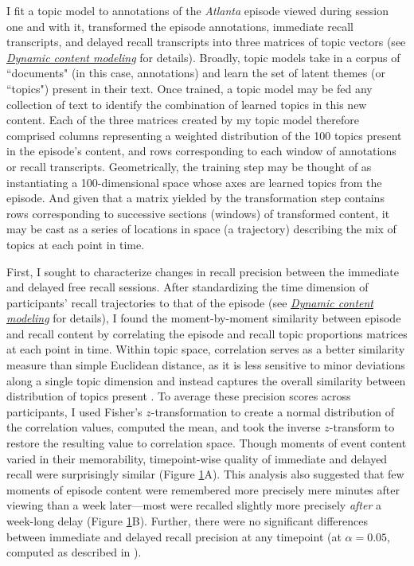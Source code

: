 \documentclass{article}
\begin{document}
\begin{figure}[p]
\label{fig:immdel}
\end{figure}

I fit a topic model to annotations of the \textit{Atlanta} episode viewed during session one and with it, transformed the episode annotations, immediate recall transcripts, and delayed recall transcripts into three matrices of topic vectors (see \hyperref[sec:topicmodeling]{\textit{Dynamic content modeling}} for details).  Broadly, topic models take in a corpus of ``documents" (in this case, annotations) and learn the set of latent themes (or ``topics") present in their text.  Once trained, a topic model may be fed any collection of text to identify the combination of learned topics in this new content.  Each of the three matrices created by my topic model therefore comprised columns representing a weighted distribution of the 100 topics present in the episode's content, and rows corresponding to each window of annotations or recall transcripts.  Geometrically, the training step may be thought of as instantiating a 100-dimensional space whose axes are learned topics from the episode.  And given that a matrix yielded by the transformation step contains rows corresponding to successive sections (windows) of transformed content, it may be cast as a series of locations in space (a trajectory) describing the mix of topics at each point in time.

First, I sought to characterize changes in recall precision between the immediate and delayed free recall sessions.  After standardizing the time dimension of participants' recall trajectories to that of the episode (see \hyperref[sec:topicmodeling]{\textit{Dynamic content modeling}} for details), I found the moment-by-moment similarity between episode and recall content by correlating the episode and recall topic proportions matrices at each point in time.  Within topic space, correlation serves as a better similarity measure than simple Euclidean distance, as it is less sensitive to minor deviations along a single topic dimension and instead captures the overall similarity between distribution of topics present \citep{HeusEtal18c}.  To average these precision scores across participants, I used Fisher's $z$-transformation \citep{Fish15} to create a normal distribution of the correlation values, computed the mean, and took the inverse $z$-transform to restore the resulting value to correlation space.  Though moments of event content varied in their memorability, timepoint-wise quality of immediate and delayed recall were surprisingly similar (Figure \ref{fig:immdel}A).  This analysis also suggested that few moments of episode content were remembered more precisely mere minutes after viewing than a week later—most were recalled slightly more precisely \textit{after} a week-long delay (Figure \ref{fig:immdel}B).  Further, there were no significant differences between immediate and delayed recall precision at any timepoint (at $\alpha=0.05$, computed as described in \citealp{Fish25}).
\end{document}
